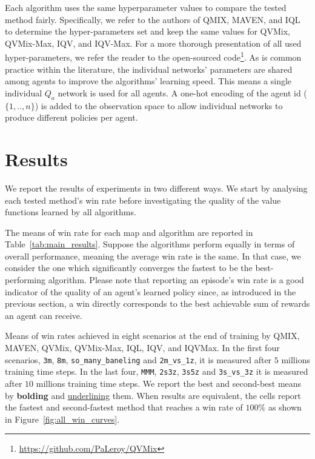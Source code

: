 Each algorithm uses the same hyperparameter values to compare the tested method fairly.
Specifically, we refer to the authors of QMIX, MAVEN, and IQL to determine the hyper-parameters set and keep the same values for QVMix, QVMix-Max, IQV, and IQV-Max. 
For a more thorough presentation of all used hyper-parameters, we refer the reader to the open-sourced code\footnote{\url{https://github.com/PaLeroy/QVMix}}.
As is common practice within the literature, the individual networks' parameters are shared among agents to improve the algorithms' learning speed.
This means a single individual $Q_a$ network is used for all agents.
A one-hot encoding of the agent id ($\{1,..,n\}$) is added to the observation space to allow individual networks to produce different policies per agent.

\section{Results} \label{sec:ch4_results}
We report the results of experiments in two different ways.
We start by analysing each tested method's win rate before investigating the quality of the value functions learned by all algorithms.

The means of win rate for each map and algorithm are reported in Table~\ref{tab:main_results}. 
Suppose the algorithms perform equally in terms of overall performance, meaning the average win rate is the same. 
In that case, we consider the one which significantly converges the fastest to be the best-performing algorithm.
Please note that reporting an episode's win rate is a good indicator of the quality of an agent's learned policy since, as introduced in the previous section, a win directly corresponds to the best achievable sum of rewards an agent can receive.

\begin{table}
    \centering
    \caption{
    Means of win rates achieved in eight scenarios at the end of training by QMIX, MAVEN, QVMix, QVMix-Max, IQL, IQV, and IQVMax. 
    In the first four scenarios, \texttt{3m}, \texttt{8m}, \texttt{so\_many\_baneling} and \texttt{2m\_vs\_1z}, it is measured after $5$ millions training time steps.
    In the last four, \texttt{MMM}, \texttt{2s3z}, \texttt{3s5z} and \texttt{3s\_vs\_3z} it is measured after $10$ millions training time steps.
    We report the best and second-best means by \textbf{bolding} and \underline{underlining} them. When results are equivalent, the cells report the fastest and second-fastest method that reaches a win rate of $100\%$ as shown in Figure~\ref{fig:all_win_curves}.}
    
    \label{tab:main_results}
\end{table}

